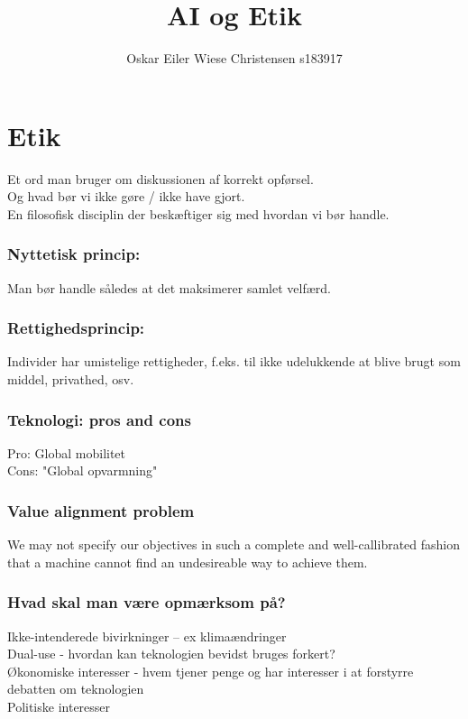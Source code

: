 \documentclass[11pt, fleqn]{article}
\title{AI og Etik}
\author{Oskar Eiler Wiese Christensen s183917}
\date{}
\begin{document}
	
	\maketitle
	
	\section*{Etik}
	Et ord man bruger om diskussionen af korrekt opførsel. \\ Og hvad bør vi ikke gøre / ikke have gjort. \\ En filosofisk disciplin der beskæftiger sig med hvordan vi bør handle. \\ 
	
	\subsubsection*{Nyttetisk princip:}
	\vspace*{-0.2cm}
	Man bør handle således at det maksimerer samlet velfærd.
	
	\subsubsection*{Rettighedsprincip:}
	\vspace*{-0.2cm}
	Individer har umistelige rettigheder, f.eks. til ikke udelukkende at blive brugt som middel, privathed, osv.

	\subsubsection*{Teknologi: pros and cons}
	\vspace*{-0.2cm}
	Pro: Global mobilitet \\ Cons: "Global opvarmning"
	
	\subsubsection*{Value alignment problem}
	\vspace*{-0.2cm}
	We may not specify our objectives in such a complete and well-callibrated fashion that a machine cannot find an undesireable way to achieve them.
	
	\subsubsection*{Hvad skal man være opmærksom på?}
	\vspace*{-0.2cm}
	Ikke-intenderede bivirkninger -- ex klimaændringer \\
	Dual-use - hvordan kan teknologien bevidst bruges forkert? \\ 
	Økonomiske interesser - hvem tjener penge og har interesser i at forstyrre debatten om teknologien \\ 
	Politiske interesser
	
\end{document}
